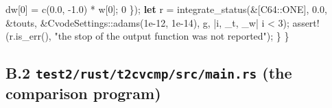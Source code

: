 \documentclass[
  10pt,
]{article}
\newenvironment{Shaded}{}{}
\newcommand{\DecValTok}[1]{\textcolor[rgb]{0.25,0.63,0.44}{#1}}
\newcommand{\KeywordTok}[1]{\textcolor[rgb]{0.00,0.44,0.13}{\textbf{#1}}}
\newcommand{\NormalTok}[1]{#1}
\newcommand{\OperatorTok}[1]{\textcolor[rgb]{0.40,0.40,0.40}{#1}}
\newcommand{\PreprocessorTok}[1]{\textcolor[rgb]{0.74,0.48,0.00}{#1}}
\newcommand{\StringTok}[1]{\textcolor[rgb]{0.25,0.44,0.63}{#1}}
\begin{document}
\begin{Shaded}
\begin{Highlighting}[]
\NormalTok{            dw[}\DecValTok{0}\NormalTok{] }\OperatorTok{=}\NormalTok{ c(}\DecValTok{0.0}\OperatorTok{,} \OperatorTok{{-}}\DecValTok{1.0}\NormalTok{) }\OperatorTok{*}\NormalTok{ w[}\DecValTok{0}\NormalTok{]}\OperatorTok{;}
            \DecValTok{0}
        \OperatorTok{\}}\NormalTok{)}\OperatorTok{;}
        \KeywordTok{let}\NormalTok{ r }\OperatorTok{=}\NormalTok{ integrate\_status(}\OperatorTok{\&}\NormalTok{[}\PreprocessorTok{C64::}\NormalTok{ONE]}\OperatorTok{,} \DecValTok{0.0}\OperatorTok{,} \OperatorTok{\&}\NormalTok{touts}\OperatorTok{,} \OperatorTok{\&}\PreprocessorTok{CvodeSettings::}\NormalTok{adams(}\DecValTok{1e{-}12}\OperatorTok{,} \DecValTok{1e{-}14}\NormalTok{)}\OperatorTok{,}\NormalTok{ g}\OperatorTok{,} \OperatorTok{|}\NormalTok{i}\OperatorTok{,}\NormalTok{ \_t}\OperatorTok{,}\NormalTok{ \_w}\OperatorTok{|}\NormalTok{ i }\OperatorTok{\textless{}} \DecValTok{3}\NormalTok{)}\OperatorTok{;}
        \PreprocessorTok{assert!}\NormalTok{(r}\OperatorTok{.}\NormalTok{is\_err()}\OperatorTok{,} \StringTok{"the stop of the output function was not reported"}\NormalTok{)}\OperatorTok{;}
    \OperatorTok{\}}
\OperatorTok{\}}
\end{Highlighting}
\end{Shaded}

\hypertarget{b.2-test2rustt2cvcmpsrcmain.rs-the-comparison-program}{%
\subsection{\texorpdfstring{B.2 \texttt{test2/rust/t2cvcmp/src/main.rs}
(the comparison
program)}{B.2 test2/rust/t2cvcmp/src/main.rs (the comparison program)}}\label{b.2-test2rustt2cvcmpsrcmain.rs-the-comparison-program}}
\end{document}
